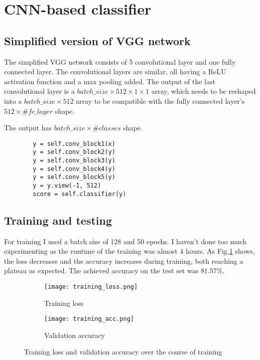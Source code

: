 \documentclass[10pt,a4paper,twoside]{article}
\begin{document}
\section{CNN-based classifier}
\subsection{Simplified version of VGG network}
The simplified VGG network consists of 5 convolutional layer and one fully
connected layer. The convolutional layers are similar, all having a ReLU
activation function and a max pooling added. The output of the last
convolutional layer is a $batch\_size \times 512 \times 
1 \times 1$ array, which needs
to be reshaped into a $batch\_size \times 512$ array to be compatible with the
fully connected layer's $512 \times \# fc\_layer$ shape.

The output has $batch\_size \times \# classes$ shape.

\begin{verbatim}
        y = self.conv_block1(x)
        y = self.conv_block2(y)
        y = self.conv_block3(y)
        y = self.conv_block4(y)
        y = self.conv_block5(y)
        y = y.view(-1, 512)
        score = self.classifier(y)
\end{verbatim}


\subsection{Training and testing}
For training I used a batch size of 128 and 50 epochs. I haven't done too much
experimenting as the runtime of the training was almost 4 hours. As Fig.\ref{result}
shows, the loss decreases and the accuracy increases during training, both
reaching a plateau as expected. The achieved
accuracy on the test set was $81.57\%$.

\begin{figure}[h]
    \centering
    
    \begin{subfigure}{0.4\textwidth}
    \texttt{[image: training\_loss.png]} 
    \caption{Training loss}
    \end{subfigure}
    \begin{subfigure}{0.4\textwidth}
    \texttt{[image: training\_acc.png]} 
    \caption{Validation accuracy}
    \end{subfigure}
    \caption{Training loss and validation accuracy over the course of training}

    \label{result}
\end{figure}

\end{document}
